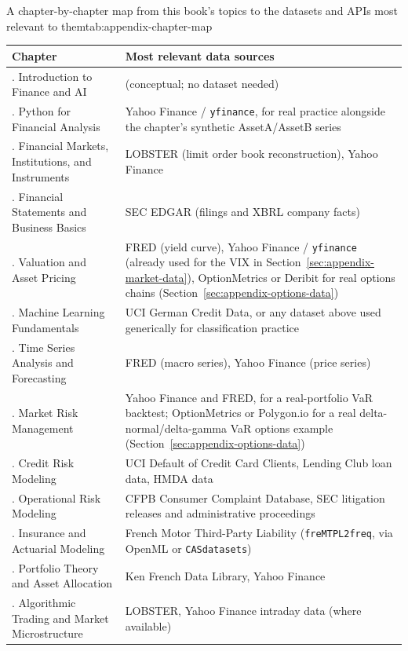 \documentclass[../ai_in_finance]{subfiles}
\begin{document}
\begin{booktable}[htbp]{A chapter-by-chapter map from this book's topics to the datasets and APIs most relevant to them}{tab:appendix-chapter-map}
\begin{tabular}{L{4.8cm}L{10.6cm}}
\toprule
Chapter & Most relevant data sources \\
\midrule
{}. Introduction to Finance and AI & (conceptual; no dataset needed) \\
. Python for Financial Analysis & Yahoo Finance / \texttt{yfinance}, for real practice alongside the chapter's synthetic AssetA/AssetB series \\
. Financial Markets, Institutions, and Instruments & LOBSTER (limit order book reconstruction), Yahoo Finance \\
. Financial Statements and Business Basics & SEC EDGAR (filings and XBRL company facts) \\
. Valuation and Asset Pricing & FRED (yield curve), Yahoo Finance / \texttt{yfinance} (already used for the VIX in Section~\ref{sec:appendix-market-data}), OptionMetrics or Deribit for real options chains (Section~\ref{sec:appendix-options-data}) \\
. Machine Learning Fundamentals & UCI German Credit Data, or any dataset above used generically for classification practice \\
. Time Series Analysis and Forecasting & FRED (macro series), Yahoo Finance (price series) \\
. Market Risk Management & Yahoo Finance and FRED, for a real-portfolio VaR backtest; OptionMetrics or Polygon.io for a real delta-normal/delta-gamma VaR options example (Section~\ref{sec:appendix-options-data}) \\
. Credit Risk Modeling & UCI Default of Credit Card Clients, Lending Club loan data, HMDA data \\
. Operational Risk Modeling & CFPB Consumer Complaint Database, SEC litigation releases and administrative proceedings \\
. Insurance and Actuarial Modeling & French Motor Third-Party Liability (\texttt{freMTPL2freq}, via OpenML or \texttt{CASdatasets}) \\
. Portfolio Theory and Asset Allocation & Ken French Data Library, Yahoo Finance \\
. Algorithmic Trading and Market Microstructure & LOBSTER, Yahoo Finance intraday data (where available) \\

\end{tabular}
\end{booktable}
\end{document}

